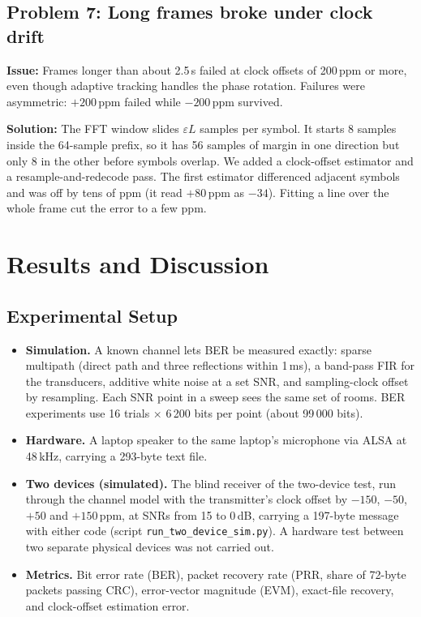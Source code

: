 \documentclass[11pt,a4paper]{report}
\begin{document}
\section{Problem 7: Long frames broke under clock drift}
\textbf{Issue:} Frames longer than about 2.5\,s failed at clock offsets of 200\,ppm
or more, even though adaptive tracking handles the phase rotation. Failures were
asymmetric: $+200$\,ppm failed while $-200$\,ppm survived.

\textbf{Solution:} The FFT window slides $\varepsilon L$ samples per symbol. It
starts 8 samples inside the 64-sample prefix, so it has 56 samples of margin in one
direction but only 8 in the other before symbols overlap. We added a clock-offset
estimator and a resample-and-redecode pass. The first estimator differenced
adjacent symbols and was off by tens of ppm (it read $+80$\,ppm as $-34$). Fitting a
line over the whole frame cut the error to a few ppm.

\chapter{Results and Discussion}

\section{Experimental Setup}
\begin{itemize}
    \item \textbf{Simulation.} A known channel lets BER be measured exactly: sparse
    multipath (direct path and three reflections within 1\,ms), a band-pass FIR for the
    transducers, additive white noise at a set SNR, and sampling-clock offset by
    resampling. Each SNR point in a sweep sees the same set of rooms. BER experiments
    use 16 trials $\times$ 6\,200 bits per point (about 99\,000 bits).
    \item \textbf{Hardware.} A laptop speaker to the same laptop's microphone via ALSA at
    48\,kHz, carrying a 293-byte text file.
    \item \textbf{Two devices (simulated).} The blind receiver of the two-device test,
    run through the channel model with the transmitter's clock offset by $-150$, $-50$,
    $+50$ and $+150$\,ppm, at SNRs from 15 to 0\,dB, carrying a 197-byte message with
    either code (script \texttt{run\_two\_device\_sim.py}). A hardware test
    between two separate physical devices was not carried out.
    \item \textbf{Metrics.} Bit error rate (BER), packet recovery rate (PRR, share of
    72-byte packets passing CRC), error-vector magnitude (EVM), exact-file recovery,
    and clock-offset estimation error.
\end{itemize}
\end{document}
